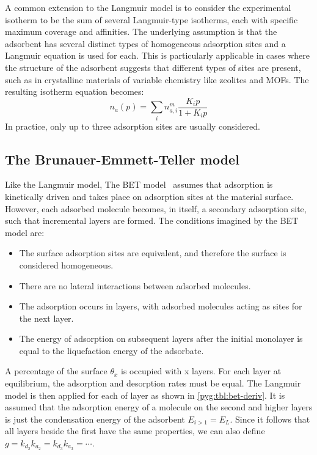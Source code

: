 A common extension to the Langmuir model is to consider
the experimental isotherm to be the sum of several Langmuir-type
isotherms, each with specific maximum coverage and affinities.
The underlying assumption is that the adsorbent has several distinct
types of homogeneous adsorption sites and a Langmuir
equation is used for each. This is particularly
applicable in cases where the structure of the adsorbent
suggests that different types of sites are present,
such as in crystalline materials of variable chemistry like
zeolites and \glspl{MOF}. The resulting isotherm equation becomes:
%
\begin{equation}\label{pyg:eqn:langmulti}
	n_a(p) = \sum_i n_{a,i}^m\frac{K_i p}{1+K_i p}
\end{equation}
%
In practice, only up to three adsorption sites are usually
considered.

\subsection{The Brunauer-Emmett-Teller model}\label{pyg:models:bet}

Like the Langmuir model, The \gls{BET} model~\cite{brunauerAdsorptionGasesMultimolecular1938}
assumes that adsorption is kinetically driven and takes place on adsorption
sites at the material surface. However, each adsorbed molecule becomes,
in itself, a secondary adsorption site, such that incremental layers
are formed. The conditions imagined by the \gls{BET} model are:

\begin{itemize}
	\item The surface adsorption sites are equivalent, and therefore the
	      surface is considered homogeneous.
	\item There are no lateral interactions between adsorbed
	      molecules.
	\item The adsorption occurs in layers, with adsorbed
	      molecules acting as sites for the next layer.
	\item The energy of adsorption on subsequent layers after 
		  the initial monolayer is equal to the liquefaction energy
		  of the adsorbate.
\end{itemize}

A percentage of the surface \(\theta_x\) is occupied with
x layers. For each layer at equilibrium, the adsorption and
desorption rates must be equal.
The Langmuir model is then applied for each of layer
as shown in \autoref{pyg:tbl:bet-deriv}. It is assumed
that the adsorption energy of a molecule on the second
and higher layers is just the condensation energy of the
adsorbent \(E_{i>1} = E_L\). Since it follows that
all layers beside the first have the same properties,
we can also define \(g= {k_{d_2}}{k_{a_2}} = {k_{d_3}}{k_{a_3}} =
\cdots \).

